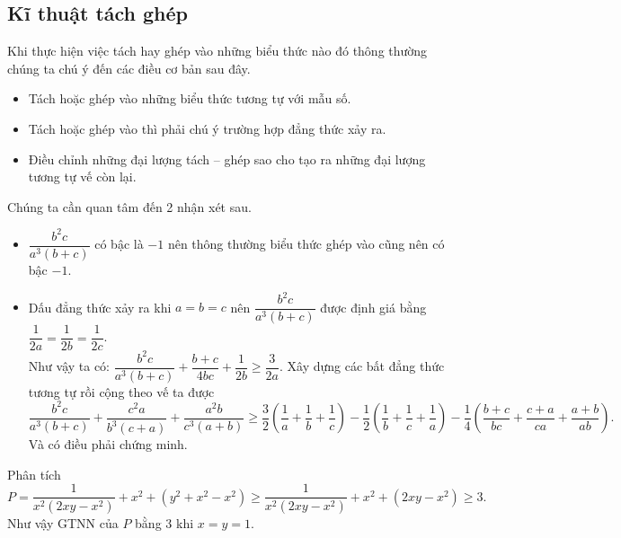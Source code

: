 \subsection{Kĩ thuật tách ghép}
Khi thực hiện việc tách hay ghép vào những biểu thức nào đó thông thường chúng ta chú ý đến các điều cơ bản sau đây.
\begin{itemize}
\item Tách hoặc ghép vào những biểu thức tương tự với mẫu số.
\item Tách hoặc ghép vào thì phải chú ý trường hợp đẳng thức xảy ra.
\item Điều chỉnh những đại lượng tách – ghép sao cho tạo ra những đại lượng tương tự vế còn lại.
\end{itemize}
\hda  Chúng ta cần quan tâm đến 2 nhận xét sau.
\begin{itemize}
\item $\dfrac{{{b}^{2}}c}{{{a}^{3}}\left( b+c \right)}$ có bậc là  $-1$ nên thông thường biểu thức ghép vào cũng nên có bậc  $-1$.
\item Dấu đẳng thức xảy ra khi $a = b = c$ nên $\dfrac{{{b}^{2}}c}{{{a}^{3}}\left( b+c \right)}$ được định giá bằng $\dfrac{1}{2a}=\dfrac{1}{2b}=\dfrac{1}{2c}$.\\
Như vậy ta có: $\dfrac{{{b}^{2}}c}{{{a}^{3}}\left( b+c \right)}+\dfrac{b+c}{4bc}+\dfrac{1}{2b}\ge \dfrac{3}{2a}$. Xây dựng các bất đẳng thức tương tự rồi cộng theo vế ta được
\[\frac{{{b}^{2}}c}{{{a}^{3}}\left( b+c \right)}+\frac{{{c}^{2}}a}{{{b}^{3}}\left( c+a \right)}+\frac{{{a}^{2}}b}{{{c}^{3}}\left( a+b \right)}\ge \frac{3}{2}\left( \frac{1}{a}+\frac{1}{b}+\frac{1}{c} \right)-\frac{1}{2}\left( \frac{1}{b}+\frac{1}{c}+\frac{1}{a} \right)-\frac{1}{4}\left( \frac{b+c}{bc}+\frac{c+a}{ca}+\frac{a+b}{ab} \right).\]
Và có điều phải chứng minh.
\end{itemize}
\hda  Phân tích \[P=\frac{1}{{{x}^{2}}\left( 2xy-{{x}^{2}} \right)}+{{x}^{2}}+\left( {{y}^{2}}+{{x}^{2}}-{{x}^{2}} \right)\ge \frac{1}{{{x}^{2}}\left( 2xy-{{x}^{2}} \right)}+{{x}^{2}}+\left( 2xy-{{x}^{2}} \right)\ge 3.\]
Như vậy GTNN của $P$ bằng $3$ khi $x = y = 1$.\\
